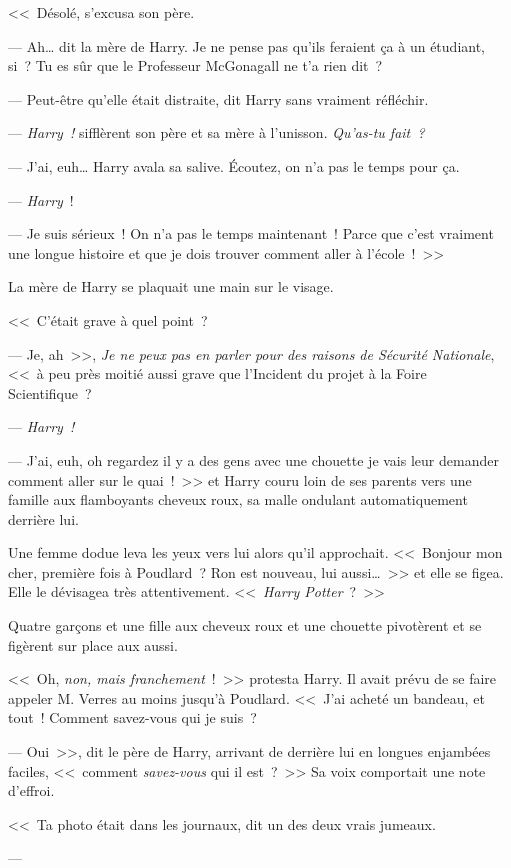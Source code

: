 <<~Désolé, s'excusa son père.

--- Ah… dit la mère de Harry. Je ne pense pas qu'ils feraient ça à un étudiant, si~? Tu es sûr que le Professeur McGonagall ne t'a rien dit~?

--- Peut-être qu'elle était distraite, dit Harry sans vraiment réfléchir.

--- \emph{Harry~!} sifflèrent son père et sa mère à l'unisson. \emph{Qu'as-tu fait~?}

--- J'ai, euh… Harry avala sa salive. Écoutez, on n'a pas le temps pour ça.

--- \emph{Harry}~!

--- Je suis sérieux~! On n'a pas le temps maintenant~! Parce que c'est vraiment une longue histoire et que je dois trouver comment aller à l'école~!~>>

La mère de Harry se plaquait une main sur le visage. 

<<~C'était grave à quel point~?

--- Je, ah~>>, \emph{Je ne peux pas en parler pour des raisons de Sécurité Nationale}, <<~à peu près moitié aussi grave que l'Incident du projet à la Foire Scientifique~?

--- \emph{Harry~!}

--- J'ai, euh, oh regardez il y a des gens avec une chouette je vais leur demander comment aller sur le quai~!~>> et Harry couru loin de ses parents vers une famille aux flamboyants cheveux roux, sa malle ondulant automatiquement derrière lui.

Une femme dodue leva les yeux vers lui alors qu'il approchait. <<~Bonjour mon cher, première fois à Poudlard~? Ron est nouveau, lui aussi…~>> et elle se figea. Elle le dévisagea très attentivement. <<~\emph{Harry Potter}~?~>>

Quatre garçons et une fille aux cheveux roux et une chouette pivotèrent et se figèrent sur place aux aussi.

<<~Oh, \emph{non, mais franchement}~!~>> protesta Harry. Il avait prévu de se faire appeler M. Verres au moins jusqu'à Poudlard. <<~J'ai acheté un bandeau, et tout~! Comment savez-vous qui je suis~?

--- Oui~>>, dit le père de Harry, arrivant de derrière lui en longues enjambées faciles, <<~comment \emph{savez-vous} qui il est~?~>> Sa voix comportait une note d'effroi.

<<~Ta photo était dans les journaux, dit un des deux vrais jumeaux.

--- 

